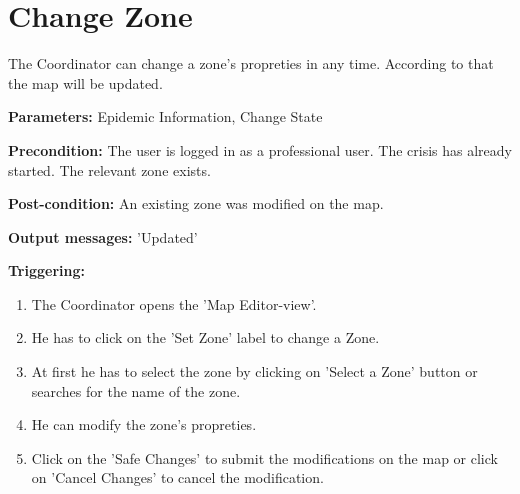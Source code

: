 \section{Change Zone}
\label{operation:ChangeZone}
The Coordinator can change a zone's propreties in any time. According
to that the map will be updated.\\
\begin{description}
\item \textbf{Parameters:} Epidemic Information, Change State
\item \textbf{Precondition:} The user is logged in as a professional user. The
crisis has already started. The relevant zone exists.
\item \textbf{Post-condition:} An existing zone was modified on the map.
\item \textbf{Output messages:} 'Updated'
\item \textbf{Triggering:}
\begin{enumerate}
\item The Coordinator opens the 'Map Editor-view'.
\item He has to click on the 'Set Zone' label to change a Zone.
\item At first he has to select the zone by clicking on 'Select a Zone' button
or searches for the name of the zone.
\item He can modify the zone's propreties.
\item Click on the 'Safe Changes' to submit the modifications
on the map or click on 'Cancel Changes' to cancel the modification.
\end{enumerate}
\end{description} 

